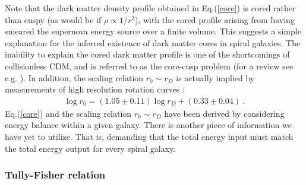 \documentclass[12pt]{article}
\begin{document}
{{Note that the dark matter density profile obtained in Eq.(\ref{core}) is cored rather than cuspy (as would be if $\rho \propto 1/r ^2$), with the cored profile arising from having smeared the supernova energy source over a finite volume. This suggests a simple explanation for the inferred existence of dark matter cores in spiral galaxies. The inability to explain the cored dark matter profile is one of the shortcomings of collisionless CDM, and is referred to as the core-cusp problem (for a review see e.g. \cite{deblok}). In addition, the scaling relation $r _0 \sim r_D$ is actually implied by measurements of high resolution rotation curves \cite{donato}:
%
\begin{eqnarray}
\log r _0 = (1.05 \pm 0.11) \log r_D + (0.33 \pm 0.04) \ .
\end{eqnarray}
%
Eq.(\ref{core}) and the scaling relation $r _0 \sim r _D$ have been derived by considering energy balance within a given galaxy. There is another piece of information we have yet to utilize. That is, demanding that the total energy input must match the total energy output for every spiral galaxy.

\subsubsection{Tully-Fisher relation}

}}
\end{document}
